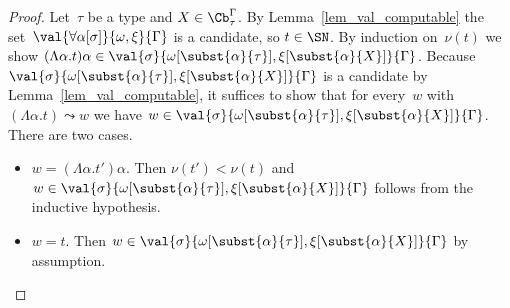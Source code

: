 \begin{proof}
 Let~$\tau$ be a type and $X \in \Cb_\tau^\Gamma$. By
 Lemma~\ref{lem_val_computable} the
 set~$\val{\forall\alpha[\sigma]}{\omega,\xi}{\Gamma}$ is a
 candidate, so $t \in \SN$. By induction on~$\nu(t)$ we show
 $(\Lambda \alpha . t) \alpha \in
 \val{\sigma}{\omega[\subst{\alpha}{\tau}],\xi[\subst{\alpha}{X}]}{\Gamma}$.
 Because~$\val{\sigma}{\omega[\subst{\alpha}{\tau}],\xi[\subst{\alpha}{X}]}{\Gamma}$
 is a candidate by Lemma~\ref{lem_val_computable}, it suffices to
 show that for every~$w$ with $(\Lambda \alpha . t) \leadsto w$ we
 have
 $w \in
 \val{\sigma}{\omega[\subst{\alpha}{\tau}],\xi[\subst{\alpha}{X}]}{\Gamma}$. There
 are two cases.
 \begin{itemize}
 \item $w = (\Lambda \alpha . t') \alpha$. Then $\nu(t') < \nu(t)$
   and
   $w \in
   \val{\sigma}{\omega[\subst{\alpha}{\tau}],\xi[\subst{\alpha}{X}]}{\Gamma}$
   follows from the inductive hypothesis.
 \item $w = t$. Then
   $w \in
   \val{\sigma}{\omega[\subst{\alpha}{\tau}],\xi[\subst{\alpha}{X}]}{\Gamma}$
   by assumption.
 \end{itemize}
\end{proof}
